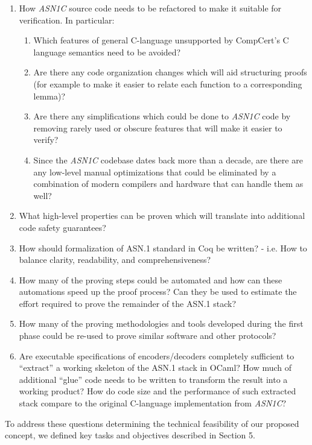 \documentclass[acmsmall,nonacm]{acmart}
\begin{document}
\begin{enumerate}
\item How \emph{ASN1C} source code needs to be refactored to make it suitable for verification. In particular:
  \begin{enumerate}
  \item Which features of general C-language unsupported by CompCert's C language semantics need to be avoided?
  \item Are there any code organization changes which will aid structuring proofs (for example to make it easier to relate each function to a corresponding lemma)?
  \item Are there any simplifications which could be done to \emph{ASN1C} code by removing rarely used or obscure features that will make it easier to verify?
  \item Since the \emph{ASN1C} codebase dates back more than a decade, are there are any low-level manual optimizations that could be eliminated by a combination of modern compilers and hardware that can handle them as well?
  \end{enumerate}
\item What high-level properties can be proven which will translate into additional code safety guarantees?
\item How should formalization of ASN.1 standard in Coq be written? - i.e. How to balance clarity, readability, and comprehensiveness?
\item How many of the proving steps could be automated and how can these automations speed up the proof process? Can they be used to estimate the effort required to prove the remainder of the ASN.1 stack?
\item How many of the proving methodologies and tools developed during the first phase could be re-used to prove similar software and other
  protocols?
  \item Are executable specifications of encoders/decoders completely sufficient to ``extract'' a working skeleton of the ASN.1 stack in OCaml? How much of additional ``glue'' code needs to be written to transform the result into a working product? How do code size and the performance of such extracted stack compare to the original C-language implementation from \emph{ASN1C}?  
\end{enumerate}

To address these questions determining the technical feasibility of
our proposed concept, we defined key tasks and objectives described in Section 5.
 
\end{document}
